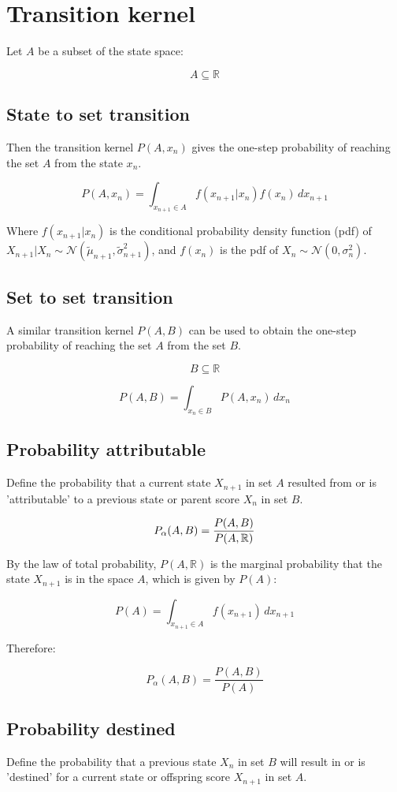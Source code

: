 \documentclass[a4paper,11pt]{article}
\begin{document}
\section{Transition kernel}

Let $A$ be a subset of the state space:

$$A \subseteq \mathbb{R}$$

\subsection{State to set transition}
Then the transition kernel $P(A, x_n)$ gives the one-step probability of reaching the set $A$ from the state $x_n$. 

$$P(A, x_n) = \int_{x_{n+1}\in A}^{} f(x_{n+1}|x_n)f(x_n) \, dx_{n+1}$$

Where $f(x_{n+1}|x_n)$ is the conditional probability density function (pdf) of $X_{n+1}|X_n \sim \mathcal{N}(\tilde{\mu}_{n+1}, \tilde{\sigma}_{n+1}^2)$, and $f(x_n)$ is the pdf of $X_n \sim \mathcal{N}(0, \sigma_n^2)$.

\subsection{Set to set transition}
A similar transition kernel $P(A, B)$ can be used to obtain the one-step probability of reaching the set $A$ from the set $B$. 

$$B \subseteq \mathbb{R}$$

$$P(A, B) = \int_{x_n\in B}^{} P(A, x_n) \, dx_n$$

\subsection{Probability attributable}
Define the probability that a current state $X_{n+1}$ in set $A$ resulted from or is 'attributable' to a previous state or parent score $X_n$ in set $B$.

$$\large P_{\alpha}(A, B) = \frac{P(A, B)}{P(A, \mathbb{R})}$$

By the law of total probability, $P(A, \mathbb{R})$ is the marginal probability that the state $X_{n+1}$ is in the space $A$, which is given by $P(A)$:

$$P(A) = \int_{x_{n+1}\in A} f(x_{n+1}) \, dx_{n+1}$$

Therefore:

$$P_{\alpha}(A, B) = \frac{P(A, B)}{P(A)}$$




\subsection{Probability destined}
Define the probability that a previous state $X_n$ in set $B$ will result in or is 'destined' for a current state or offspring score $X_{n+1}$ in set $A$. 
\end{document}
